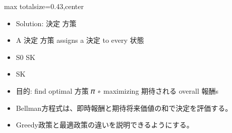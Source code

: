 \clearpage
{}
\begin{minipage}[t]{0.405\textwidth}
\begin{adjustbox}{max totalsize={\textwidth}{0.43\textheight},center}
\begin{minipage}{\textwidth}\scriptsize
{}\begin{itemize}
\item Solution: 決定 方策
\item A 決定 方策 assigns a 決定 to every 状態
\item S0 SK
\item SK
\item 目的: find optimal 方策 𝜋 ∗ maximizing 期待される overall 報酬s
\end{itemize}\begin{itemize}
\item Bellman方程式は、即時報酬と期待将来価値の和で決定を評価する。
\item Greedy政策と最適政策の違いを説明できるようにする。
\end{itemize}
\end{minipage}
\end{adjustbox}
\end{minipage}\hfill
